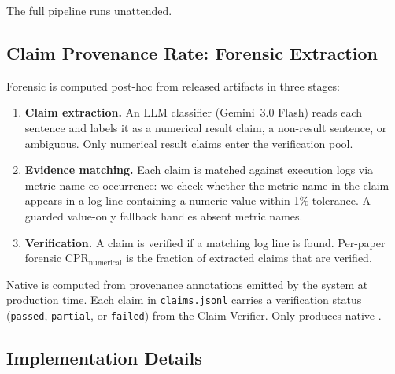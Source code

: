 The full pipeline runs unattended.

\subsection{Claim Provenance Rate: Forensic Extraction}
\label{app:forensic_cpr}

Forensic \cpr{} is computed post-hoc from released artifacts in three stages:

\begin{enumerate}[nosep,leftmargin=*]
  \item \textbf{Claim extraction.} An LLM classifier (Gemini~3.0 Flash) reads each sentence and labels it as a numerical result claim, a non-result sentence, or ambiguous. Only numerical result claims enter the verification pool.
  \item \textbf{Evidence matching.} Each claim is matched against execution logs via metric-name co-occurrence: we check whether the metric name in the claim appears in a log line containing a numeric value within 1\% tolerance. A guarded value-only fallback handles absent metric names.
  \item \textbf{Verification.} A claim is verified if a matching log line is found. Per-paper forensic $\text{CPR}_{\text{numerical}}$ is the fraction of extracted claims that are verified.
\end{enumerate}

Native \cpr{} is computed from provenance annotations emitted by the system at production time.
Each claim in \texttt{claims.jsonl} carries a verification status (\texttt{passed}, \texttt{partial}, or \texttt{failed}) from the Claim Verifier.
Only \sys{} produces native \cpr{}.

\subsection{Implementation Details}



